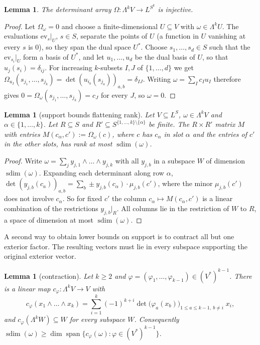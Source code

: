 \documentclass[11pt]{amsart}
\newtheorem{lemma}[theorem]{Lemma}
\theoremstyle{definition}
\theoremstyle{remark}
\numberwithin{equation}{section}
\newcommand{\spn}{\operatorname{span}}
\newcommand{\sdim}{\operatorname{sdim}}
\begin{document}
\begin{lemma}\label{lem:detinj}
The determinant array $\Omega\colon\Lambda^kV\to L^{S^k}$ is injective.
\end{lemma}

\begin{proof}
Let $\Omega_\omega=0$ and choose a finite-dimensional $U\subseteq V$ with $\omega\in\Lambda^kU$. The evaluations
$\mathrm{ev}_s|_U$, $s\in S$, separate the points of $U$ (a function in $U$ vanishing at every $s$ is $0$), so they span
the dual space $U^*$. Choose $s_1,\dots,s_d\in S$ such that the $\mathrm{ev}_{s_i}|_U$ form a basis of $U^*$, and let
$u_1,\dots,u_d$ be the dual basis of $U$, so that $u_j(s_i)=\delta_{ij}$. For increasing $k$\nobreakdash-subsets $I,J$ of
$\{1,\dots,d\}$ we get $\Omega_{u_I}(s_{j_1},\dots,s_{j_k})=\det(u_{i_b}(s_{j_a}))_{a,b}=\delta_{IJ}$. Writing
$\omega=\sum_Ic_Iu_I$ therefore gives $0=\Omega_\omega(s_{j_1},\dots,s_{j_k})=c_J$ for every $J$, so $\omega=0$.
\end{proof}

\begin{lemma}[support bounds flattening rank]\label{lem:flat}
Let $V\subseteq L^S$, $\omega\in\Lambda^kV$ and $\alpha\in\{1,\dots,k\}$. Let $R\subseteq S$ and
$R'\subseteq S^{\{1,\dots,k\}\setminus\{\alpha\}}$ be finite. The $R\times R'$ matrix $M$ with entries
$M(c_\alpha,c'):=\Omega_\omega(c)$, where $c$ has $c_\alpha$ in slot $\alpha$ and the entries of $c'$ in the other
slots, has rank at most $\sdim(\omega)$.
\end{lemma}

\begin{proof}
Write $\omega=\sum_jy_{j,1}\wedge\dots\wedge y_{j,k}$ with all $y_{j,b}$ in a subspace $W$ of dimension $\sdim(\omega)$.
Expanding each determinant along row $\alpha$,
$\det(y_{j,b}(c_a))_{a,b}=\sum_b\pm y_{j,b}(c_\alpha)\cdot\mu_{j,b}(c')$, where the minor $\mu_{j,b}(c')$ does not
involve $c_\alpha$. So for fixed $c'$ the column $c_\alpha\mapsto M(c_\alpha,c')$ is a linear combination of the
restrictions $y_{j,b}|_R$. All columns lie in the restriction of $W$ to $R$, a space of dimension at most
$\sdim(\omega)$.
\end{proof}

A second way to obtain lower bounds on support is to contract all but one exterior factor. The resulting vectors
must lie in every subspace supporting the original exterior vector.

\begin{samepage}
\begin{lemma}[contraction]\label{lem:contr}
Let $k\ge2$ and $\varphi=(\varphi_1,\dots,\varphi_{k-1})\in(V^*)^{k-1}$. There is a linear map $c_\varphi\colon\Lambda^kV\to V$
with
\[
c_\varphi(x_1\wedge\dots\wedge x_k)=\sum_{i=1}^k(-1)^{k+i}\det\bigl(\varphi_a(x_b)\bigr)_{1\le a\le k-1,\ b\ne i}\;x_i ,
\]
and $c_\varphi(\Lambda^kW)\subseteq W$ for every subspace $W$. Consequently
$\sdim(\omega)\ge\dim\spn\{c_\varphi(\omega):\varphi\in(V^*)^{k-1}\}$.
\end{lemma}
\end{samepage}
\end{document}
